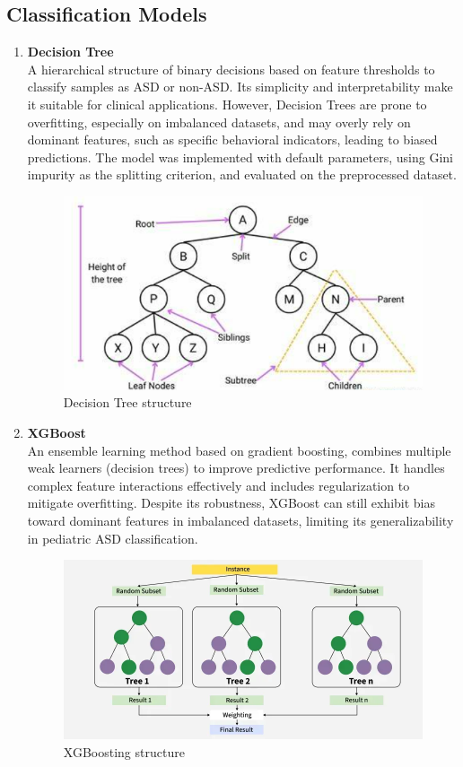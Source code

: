 \documentclass[conference]{IEEEtran}
\begin{document}
\subsection{Classification Models}
\begin{enumerate}
    \item \textbf{Decision Tree} \\
    A hierarchical structure of binary decisions based on feature thresholds to classify samples as ASD or non-ASD. Its simplicity and interpretability make it suitable for clinical applications. However, Decision Trees are prone to overfitting, especially on imbalanced datasets, and may overly rely on dominant features, such as specific behavioral indicators, leading to biased predictions. The model was implemented with default parameters, using Gini impurity as the splitting criterion, and evaluated on the preprocessed dataset.
    
    \begin{figure}[H]
    \centering
    \includegraphics[width=0.9\linewidth]{images/decisionTree.png}
    \caption{Decision Tree structure}
    \label{fig:decision-tree}
    \end{figure}
    \item \textbf{XGBoost} \\
    An ensemble learning method based on gradient boosting, combines multiple weak learners (decision trees) to improve predictive performance. It handles complex feature interactions effectively and includes regularization to mitigate overfitting. Despite its robustness, XGBoost can still exhibit bias toward dominant features in imbalanced datasets, limiting its generalizability in pediatric ASD classification.
    \begin{figure}[H]
    \centering
    \includegraphics[width=0.9\linewidth]{images/XGB.png}
    \caption{XGBoosting structure}
    \label{fig:xgboost-structure}
    \end{figure}
    

\end{enumerate}
\end{document}
